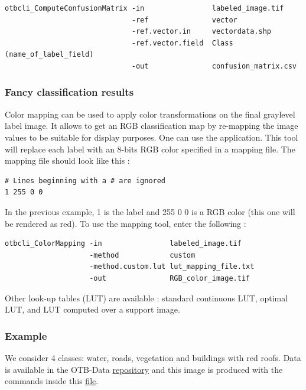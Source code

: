 \begin{verbatim}
otbcli_ComputeConfusionMatrix -in                labeled_image.tif
                              -ref               vector
                              -ref.vector.in     vectordata.shp
                              -ref.vector.field  Class (name_of_label_field)
                              -out               confusion_matrix.csv
\end{verbatim}



\subsubsection{Fancy classification results}
\label{ssec:classificationcolormapping}
Color mapping can be used to apply color transformations on the final
graylevel label image. It allows to get an RGB classification map
by re-mapping the image values to be suitable for display purposes.
One can use the  application. This tool will
replace each label with an 8-bits RGB color specified in a mapping
file. The mapping file should look like this :

\begin{verbatim}
# Lines beginning with a # are ignored
1 255 0 0
\end{verbatim}

In the previous example, 1 is the label and 255 0 0 is a RGB color
(this one will be rendered as red). To use the mapping tool, enter
the following :

\begin{verbatim}
otbcli_ColorMapping -in                labeled_image.tif
                    -method            custom
                    -method.custom.lut lut_mapping_file.txt
                    -out               RGB_color_image.tif
\end{verbatim}

Other look-up tables (LUT) are available : standard continuous LUT,
optimal LUT, and LUT computed over a support image.

\subsubsection{Example}

We consider 4 classes: water, roads, vegetation and buildings with red roofs.
Data is available in the OTB-Data
\href{http://hg.orfeo-toolbox.org/OTB-Data/file/0fed8f4f035c/Input/Classification}{repository}
and this image is produced with the commands inside this
\href{http://hg.orfeo-toolbox.org/OTB-Applications/file/3ce975605013/Testing/Classification/CMakeLists.txt}{file}.

